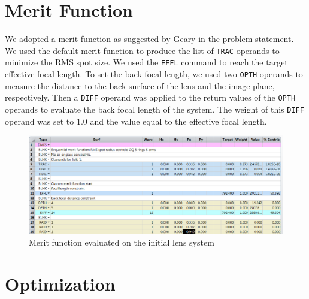 \documentclass[10pt]{article}
\begin{document}
\section{Merit Function}
We adopted a merit function as suggested by Geary in the problem statement. We used the default merit function to produce the list of \texttt{TRAC} operands to minimize the RMS spot size. We used the \texttt{EFFL} command to reach the target effective focal length. To set the back focal length, we used two \texttt{OPTH} operands to measure the distance to the back surface of the lens and the image plane, respectively. Then a \texttt{DIFF} operand was applied to the return values of the \texttt{OPTH} operands to evaluate the back focal length of the system. The weight of this \texttt{DIFF} operand was set to 1.0 and the value equal to the effective focal length.

\begin{figure}[h!]
	\centering
	\includegraphics[width=0.75\linewidth]{../zemax/1_oneElement/1_initial/merit.PNG}
	\caption{Merit function evaluated on the initial lens system}
\end{figure}
\section{Optimization}
\end{document}
